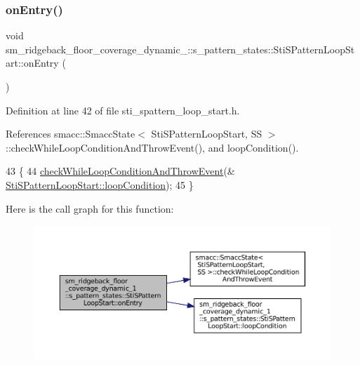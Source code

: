 \subsubsection{\texorpdfstring{on\+Entry()}{onEntry()}}
{\footnotesize\ttfamily void sm\+\_\+ridgeback\+\_\+floor\+\_\+coverage\+\_\+dynamic\+\_\+::s\+\_\+pattern\+\_\+states\+::\+Sti\+S\+Pattern\+Loop\+Start\+::on\+Entry (\begin{DoxyParamCaption}{ }\end{DoxyParamCaption})\hspace{0.3cm}{\ttfamily [inline]}}



Definition at line 42 of file sti\+\_\+spattern\+\_\+loop\+\_\+start.\+h.



References smacc\+::\+Smacc\+State$<$ Sti\+S\+Pattern\+Loop\+Start, S\+S $>$\+::check\+While\+Loop\+Condition\+And\+Throw\+Event(), and loop\+Condition().


\begin{DoxyCode}
43   \{
44     \hyperlink{classsmacc_1_1SmaccState_a80082718f226bebedb589f0c4696001d}{checkWhileLoopConditionAndThrowEvent}(&
      \hyperlink{structsm__ridgeback__floor__coverage__dynamic__1_1_1s__pattern__states_1_1StiSPatternLoopStart_a5833f41a367d2e4e346c17e92530d0b1}{StiSPatternLoopStart::loopCondition});
45   \}
\end{DoxyCode}
Here is the call graph for this function\+:
\nopagebreak
\begin{figure}[H]
\begin{center}
\leavevmode
\includegraphics[width=350pt]{structsm__ridgeback__floor__coverage__dynamic__1_1_1s__pattern__states_1_1StiSPatternLoopStart_a8a7cbebda34b5a574d8191e88c7243bc_cgraph}
\end{center}
\end{figure}
\mbox{\label{structsm__ridgeback__floor__coverage__dynamic__1_1_1s__pattern__states_1_1StiSPatternLoopStart_ace3a47d08a072256f6b4f6dd3070fd76}} 
